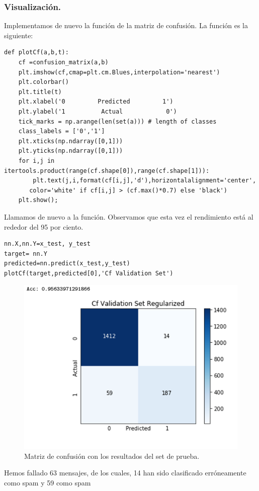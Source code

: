 \documentclass[a4paper,11pt]{article}
\begin{document}
\subsubsection{Visualización.}
Implementamos de nuevo la función de la matriz de confusión. La función es la siguiente:
\begin{lstlisting}
def plotCf(a,b,t):
    cf =confusion_matrix(a,b)
    plt.imshow(cf,cmap=plt.cm.Blues,interpolation='nearest')
    plt.colorbar()
    plt.title(t)
    plt.xlabel('0         Predicted         1')
    plt.ylabel('1          Actual            0')
    tick_marks = np.arange(len(set(a))) # length of classes
    class_labels = ['0','1']
    plt.xticks(np.ndarray([0,1]))
    plt.yticks(np.ndarray([0,1]))
    for i,j in itertools.product(range(cf.shape[0]),range(cf.shape[1])):
        plt.text(j,i,format(cf[i,j],'d'),horizontalalignment='center',    
	   color='white' if cf[i,j] > (cf.max()*0.7) else 'black')
    plt.show();
\end{lstlisting}
Llamamos de nuevo a la función. Observamos que esta vez el rendimiento está al rededor del 95 por ciento.
\begin{lstlisting}
nn.X,nn.Y=x_test, y_test 
target= nn.Y
predicted=nn.predict(x_test,y_test) 
plotCf(target,predicted[0],'Cf Validation Set')
\end{lstlisting}
\begin{figure}[H]
\centering
\includegraphics[scale=0.6]{Annotation 2020-03-23 161410}
\caption{Matriz de confusión con los resultados del set de prueba.}
\end{figure}
Hemos fallado 63 mensajes, de los cuales, 14 han sido clasificado erróneamente como spam y 59 como spam
\end{document}
